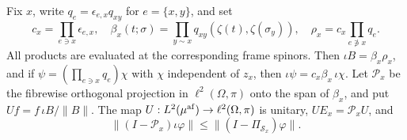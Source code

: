 \begin{lemma}\label{l:quantumfibre}
Fix \(x\), write \(q_e=\epsilon_{e,x}q_{xy}\) for \(e=\{x,y\}\),
and set
\[
 c_x=\prod_{e\ni x}\epsilon_{e,x},\quad
 \beta_x(t;\sigma)=\prod_{y\sim x}q_{xy}(\zeta(t),\zeta(\sigma_y)),
 \quad \rho_x=c_x\prod_{e\not\ni x}q_e .
\]
All products are evaluated at the corresponding frame spinors.
Then \(\iota B=\beta_x\rho_x\), and if
\(\psi=(\prod_{e\ni x}q_e)\chi\) with \(\chi\) independent of \(z_x\),
then \(\iota\psi=c_x\beta_x\,\iota\chi\).
Let \(\mathcal P_x\) be the fibrewise orthogonal projection in
\(\ell^2(\Omega,\pi)\) onto the span of \(\beta_x\), and put
\(Uf=f\,\iota B/\|B\|\).
The map \(U:L^2(\mu^{\rm af})\to\ell^2(\Omega,\pi)\) is unitary,
\(UE_x=\mathcal P_xU\), and
\[
 \|(I-\mathcal P_x)\iota\varphi\|
            \le\|(I-\Pi_{\mathcal S_x})\varphi\|.
\]
\end{lemma}

